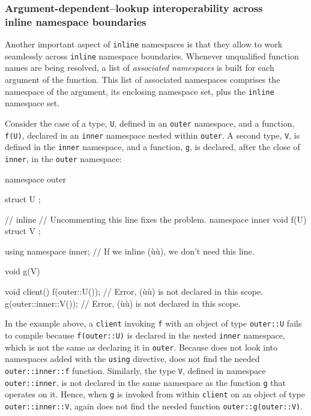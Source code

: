 \subsubsection[Argument-dependent–lookup interoperability across \lstinline!inline! \lstinline!namespace! boundaries]{Argument-dependent–lookup interoperability across\\[0.5ex] {\SubsubsecCode inline} {\SubsubsecCode namespace} boundaries}\label{argument-dependent–lookup-interoperability-across-inline-namespace-boundaries}

Another important aspect of \lstinline!inline! namespaces is that they
allow  to work seamlessly across \lstinline!inline! namespace
boundaries. Whenever unqualified function names are being resolved, a
list of \emph{associated namespaces} is built for each argument of the
function. This list of associated namespaces comprises the namespace of the
argument, its enclosing namespace set, plus the \lstinline!inline!
namespace set.

Consider the case of a type, \lstinline!U!, defined in an \lstinline!outer!
namespace, and a function, \lstinline!f(U)!, declared in an \lstinline!inner!
namespace nested within \lstinline!outer!. A second type, \lstinline!V!, is
defined in the \lstinline!inner! namespace, and a function, \lstinline!g!, is
declared, after the close of \lstinline!inner!, in the \lstinline!outer!
namespace:

\begin{emcppslisting}
namespace outer
{
    struct U { };

    // inline               // Uncommenting this line fixes the problem.
    namespace inner
    {
         void f(U) { }
         struct V { };
    }

    using namespace inner;  // If we inline (ù{}ù), we don't need this line.

    void g(V) { }
}

void client()
{
    f(outer::U());         // Error, (ù{}ù) is not declared in this scope.
    g(outer::inner::V());  // Error, (ù{}ù) is not declared in this scope.
}
\end{emcppslisting}

\noindent In the example above, a \lstinline!client! invoking \lstinline!f! with an
object of type \lstinline!outer::U! fails to compile because
\lstinline!f(outer::U)! is declared in the nested \lstinline!inner! namespace,
which is not the same as declaring it in \lstinline!outer!. Because
 does not look into namespaces added with the \lstinline!using!
directive,  does not find the needed
\lstinline!outer::inner::f! function. Similarly, the type \lstinline!V!,
defined in namespace \lstinline!outer::inner!, is not declared in the same
namespace as the function \lstinline!g! that operates on it. Hence, when
\lstinline!g! is invoked from within \lstinline!client! on an object of type
\lstinline!outer::inner::V!,  again does not find the needed
function \lstinline!outer::g(outer::V)!.

